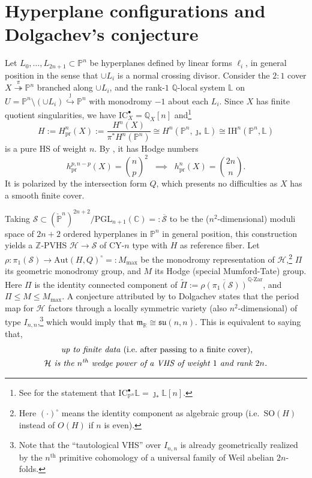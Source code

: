 \documentclass[12pt,letterpaper,english]{amsart}
\numberwithin{equation}{section}
\numberwithin{figure}{section}
\theoremstyle{plain}
\theoremstyle{remark}
\theoremstyle{definition}
\theoremstyle{definition}
\theoremstyle{plain}
\theoremstyle{plain}
\theoremstyle{plain}
\theoremstyle{plain}
\theoremstyle{definition}
\def\QQ{\mathbb{Q}}
\def\RR{\mathbb{R}}
\def\CC{\mathbb{C}}
\def\ZZ{\mathbb{Z}}
\def\PP{\mathbb{P}}
\def\H{\mathcal{H}}
\def\IH{\mathrm{IH}}
\def\LL{\mathbb{L}}
\def\sm{\setminus}
\def\pr{\mathrm{pr}}
\def\cs{\mathcal{S}}
\def\csb{\overline{\cs}}
\theoremstyle{definition}
\begin{document}
\section{Hyperplane configurations and Dolgachev's conjecture}\label{S5}

Let $L_0,\ldots,L_{2n+1}\subset \PP^n$ be hyperplanes defined by linear forms $\ell_i$, in general position in the sense that $\cup L_i$ is a normal crossing divisor. Consider the $2{:}1$ cover $X\overset{\pi}{\twoheadrightarrow}\PP^n$ branched along $\cup L_i$, and the rank-$1$ $\QQ$-local system $\LL$ on $U=\PP^n\sm(\cup L_i)\overset{\jmath}{\hookrightarrow}\PP^n$ with monodromy $-1$ about each $L_i$. Since $X$ has finite quotient singularities, we have $\mathrm{IC}^{\bullet}_X=\QQ_X[n]$ and\footnote{See \cite[Prop.~8.2.30]{HTT} for the statement that $\mathrm{IC}^{\bullet}_{\PP^n}\LL=\jmath_*\LL[n]$.}
\begin{equation}\label{E1}
H:=H^n_{\pr}(X):=\frac{H^n(X)}{\pi^*H^n(\PP^n)}\cong H^n(\PP^n,\jmath_*\LL)\cong \IH^n(\PP^n,\LL)
\end{equation}
is a pure HS of weight $n$. By \cite[Lemma 8.2]{DK}, it has Hodge numbers
\begin{equation}\label{E2}
h^{p,n-p}_{\pr}(X)=\binom{n}{p}^2\;\;\implies\;\;h^n_{\pr}(X)=\binom{2n}{n}.	
\end{equation}
It is polarized by the intersection form $Q$, which presents no difficulties as $X$ has a smooth finite cover.

Taking $\cs\subset (\check{\PP}^n)^{2n+2}/\mathrm{PGL}_{n+1}(\CC)=:\csb$ to be the ($n^2$-dimensional) moduli space of $2n+2$ ordered hyperplanes in $\PP^n$ in general position, this construction yields a $\ZZ$-PVHS $\H\to \cs$ of CY-$n$ type with $H$ as reference fiber.  Let $\rho\colon \pi_1(\cs)\to \mathrm{Aut}(H,Q)^{\circ}=:M_{\max}$ be the monodromy representation of $\H$,\footnote{Here $(\cdot)^{\circ}$ means the identity component as algebraic group (i.e.~$\mathrm{SO}(H)$ instead of $O(H)$ if $n$ is even).} $\Pi$ its geometric monodromy group, and $M$ its Hodge (special Mumford-Tate) group. Here $\Pi$ is the identity connected component of $\widetilde{\Pi}:=\overline{\rho(\pi_1(\cs))}^{\QQ\text{-Zar}}$, and $\Pi\leq M\leq M_{\max}$. A conjecture attributed by \cite{SXZ} to Dolgachev states that the period map for $\H$ factors through a locally symmetric variety (also $n^2$-dimensional) of type $I_{n,n}$,\footnote{Note that the ``tautological VHS'' over $I_{n,n}$ is already geometrically realized by the $n^{\text{th}}$ primitive cohomology of a universal family of Weil abelian $2n$-folds.} which would imply that $\mathfrak{m}_{\RR}\cong \mathfrak{su}(n,n)$. This is equivalent to saying that,
\begin{equation}\label{E3}
\begin{split}
\text{\emph{up to finite data} (i.e.~after passing to a finite cover),}\phantom{hhh}	\\ \text{\emph{$\H$ is the $n^{\text{th}}$ wedge power of a VHS of weight $1$ and rank $2n$.}}
\end{split}
\end{equation}
\end{document}
